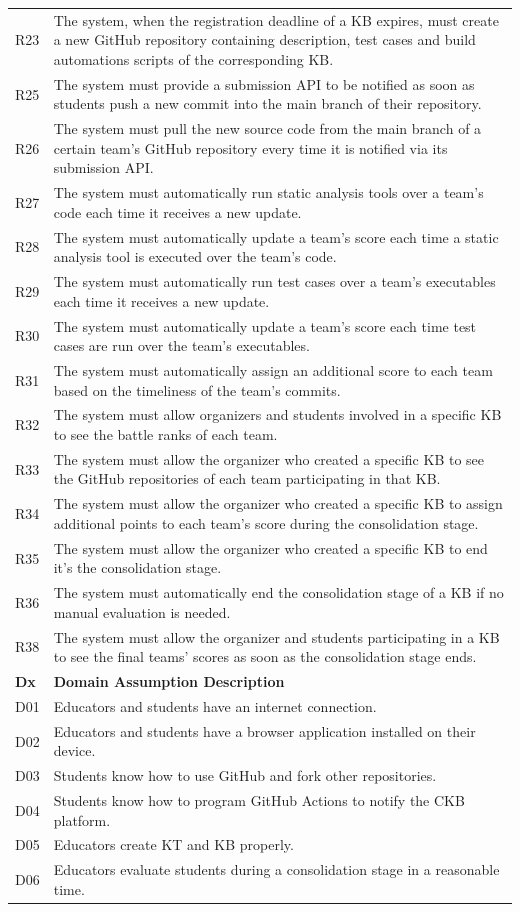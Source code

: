 \documentclass[11pt]{report}
\begin{document}
\begin{longtable}[h] {|p{10mm} p{130mm}|}
R23 & The system, when the registration deadline of a KB expires, must create a new GitHub repository containing description, test cases and build automations scripts of the corresponding KB. \\ 
R25 & The system must provide a submission API to be notified as soon as students push a new commit into the main branch of their repository. \\ 
R26 & The system must pull the new source code from the main branch of a certain team’s GitHub repository every time it is notified via its submission API. \\ 
R27 & The system must automatically run static analysis tools over a team’s code each time it receives a new update. \\ 
R28 & The system must automatically update a team’s score each time a static analysis tool is executed over the team’s code. \\
R29 & The system must automatically run test cases over a team’s executables each time it receives a new update. \\ 
R30 & The system must automatically update a team’s score each time test cases are run over the team’s executables. \\ 
R31 & The system must automatically assign an additional score to each team based on the timeliness of the team’s commits. \\ 
R32 & The system must allow organizers and students involved in a specific KB to see the battle ranks of each team. \\ 
R33 & The system must allow the organizer who created a specific KB to see the GitHub repositories of each team participating in that KB. \\ 
R34 & The system must allow the organizer who created a specific KB to assign additional points to each team’s score during the consolidation stage. \\ 
R35 & The system must allow the organizer who created a specific KB to end it’s the consolidation stage. \\ 
R36 & The system must automatically end the consolidation stage of a KB if no manual evaluation is needed. \\ 
R38 & The system must allow the organizer and students participating in a KB to see the final teams’ scores as soon as the consolidation stage ends. \\ 
\hline
\textbf{Dx} & \textbf{Domain Assumption Description} \\ \hline
D01 & Educators and students have an internet connection. \\ 
D02 & Educators and students have a browser application installed on their device. \\
D03 & Students know how to use GitHub and fork other repositories. \\ 
D04 & Students know how to program GitHub Actions to notify the CKB platform. \\
D05 & Educators create KT and KB properly. \\ 
D06 & Educators evaluate students during a consolidation stage in a reasonable time. \\ \hline
\end{longtable}
\end{document}
